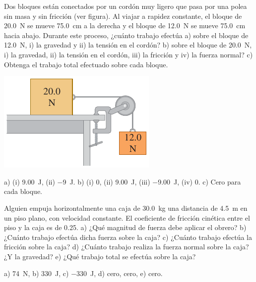 \documentclass[11pt]{article}
\begin{document}
\begin{multicols}{2}
\begin{exercise}
    Dos bloques están conectados por un cordón muy ligero que pasa por una polea sin masa y sin fricción (ver figura). Al viajar a rapidez constante, el bloque de \qty{20.0}{N} se mueve \qty{75.0}{cm} a la derecha y el bloque de \qty{12.0}{N} se mueve \qty{75.0}{cm} hacia abajo. Durante este proceso, ¿cuánto trabajo efectúa a) sobre el bloque de \qty{12.0}{N}, i) la gravedad y ii) la tensión en el cordón? b) sobre el bloque de \qty{20.0}{N}, i) la gravedad, ii) la tensión en el cordón, iii) la fricción y iv) la fuerza normal? c) Obtenga el trabajo total efectuado sobre cada bloque.
\begin{center}
    \includegraphics[scale=0.5]{figs/p-02.png}
\end{center}
\end{exercise}
\begin{solution}
    a) (i) \qty{9.00}{J}, (ii) \qty{-9}{J}. b) (i) \num{0}, (ii) \qty{9.00}{J}, (iii) \qty{-9.00}{J}, (iv) \num{0}. c) Cero para cada bloque.
\end{solution}
\end{multicols}

\begin{multicols}{2}
\begin{exercise}
    Alguien empuja horizontalmente una caja de \qty{30.0}{kg} una distancia de \qty{4.5}{m} en un piso plano, con velocidad constante. El coeficiente de fricción cinética entre el piso y la caja es de \num{0.25}. a) ¿Qué magnitud de fuerza debe aplicar el obrero? b) ¿Cuánto trabajo efectúa dicha fuerza sobre la caja? c) ¿Cuánto trabajo efectúa la fricción sobre la caja? d) ¿Cuánto trabajo realiza la fuerza normal sobre la caja? ¿Y la gravedad? e) ¿Qué trabajo total se efectúa sobre la caja?
\end{exercise}
\begin{solution}
    a) \qty{74}{N}, b) \qty{330}{J}, c) \qty{-330}{J}, d) cero, cero, e) cero.
\end{solution}
\end{multicols}
\end{document}
